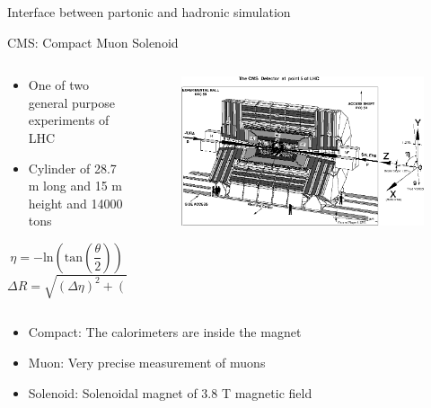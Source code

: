 \begin{frame}{Interface between partonic and hadronic simulation}
\end{frame}


\iffalse
\begin{frame}{CMS: Compact Muon Solenoid}
\vspace{-.2cm}

\begin{columns}
\begin{column}{.30\textwidth}
\begin{block}{}
\begin{itemize}\scriptsize
\item One of two general purpose experiments of LHC
\item Cylinder of 28.7 m long and 15 m height and 14000 tons
\end{itemize}
\tiny{
\begin{equation*}  
\eta = -\text{ln}\left( \text{tan}\left(\frac{\theta}{2}\right)\right)
\end{equation*}
\begin{equation*}
\Delta R=\sqrt{(\Delta\eta)^{2}+(\Delta\phi)^{2}}
\end{equation*}
}%
\end{block}
\end{column}

\begin{column}{.70\textwidth}
\begin{figure}[!Hhtbp]
  \begin{center}
    \includegraphics[width=\textwidth]{../figs/CMS_coordinates.jpg}
  \end{center}
\end{figure}
\end{column}
\end{columns}

\vspace{-.2cm}
\begin{block}{}
\begin{itemize}\scriptsize
\item Compact: The calorimeters are inside the magnet
\item Muon: Very precise measurement of muons
\item Solenoid: Solenoidal magnet of 3.8 T magnetic field
\end{itemize}
\end{block}

\end{frame}


